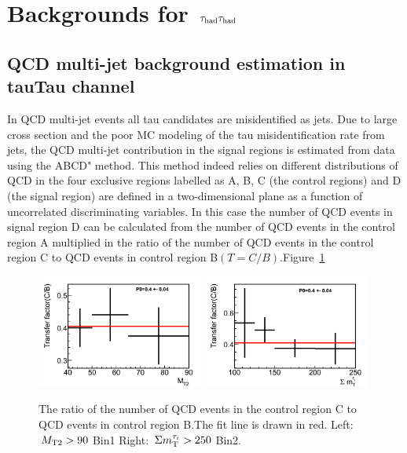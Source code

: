 \section{\texorpdfstring{Backgrounds for $\,\tau_{\rm had}\tau_{\rm had}$}{Backgrounds for tauTau}}
\label{sect:bkg}
\subsection{QCD multi-jet background estimation in tauTau channel}
In QCD multi-jet events all tau candidates are misidentified as jets. Due to large cross
section and
the poor MC modeling of the tau misidentification rate from jets, the QCD multi-jet contribution in the signal regions is estimated from data using the ABCD" method.
This method indeed relies on different distributions of QCD
in the four exclusive regions labelled as A, B, C (the control regions) and D (the signal region) are defined in a two-dimensional plane as a function of uncorrelated discriminating variables.
In this case the number of QCD events in signal region D can be calculated from the number of QCD events in the control region A multiplied in the ratio of the number of QCD events in the control region C to QCD events in control region B$(T=C/B)$.Figure~\ref{fig:1QCDbg}
\begin{figure}[htbp]
\centering
\includegraphics[width=0.49\textwidth]{QCDbginTauTau/Bin1_transferfactor.png}
\includegraphics[width=0.49\textwidth]{QCDbginTauTau/Bin2_transferfactor.png} \\
\caption{The ratio of the number of QCD events in the control region C to QCD events in control region B.The
fit line is drawn in red.
Left: $\,{M_{\rm T2}}>90$ Bin1 Right: $\,\Sigma m_{\rm T}^{\tau_i} >250$ Bin2.}
\label{fig:1QCDbg}
\end{figure}
